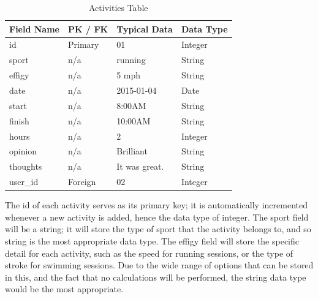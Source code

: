 \documentclass{article}[12pt,a4paper]
\begin{document}
\begin{table}[h]
\begin{tabular}{|l|l|l|l|}
\hline
\textbf{Field Name} & \textbf{PK / FK} & \textbf{Typical Data} & \textbf{Data Type} \\ \hline
id                  & Primary          & 01                    & Integer            \\ \hline
sport               & n/a              & running               & String             \\ \hline
effigy              & n/a              & 5 mph                 & String             \\ \hline
date                & n/a              & 2015-01-04            & Date               \\ \hline
start               & n/a              & 8:00AM                & String             \\ \hline
finish              & n/a              & 10:00AM               & String             \\ \hline
hours               & n/a              & 2                     & Integer            \\ \hline
opinion             & n/a              & Brilliant             & String             \\ \hline
thoughts            & n/a              & It was great.         & String             \\ \hline
user\_id            & Foreign          & 02                    & Integer            \\ \hline
\end{tabular}
\caption{Activities Table}
\end{table}

The id of each activity serves as its primary key; it is automatically incremented whenever a new activity is added, hence the data type of integer. The sport field will be a string; it will store the type of sport that the activity belongs to, and so string is the most appropriate data type. The effigy field will store the specific detail for each activity, such as the speed for running sessions, or the type of stroke for swimming sessions. Due to the wide range of options that can be stored in this, and the fact that no calculations will be performed, the string data type would be the most appropriate. 
\end{document}
